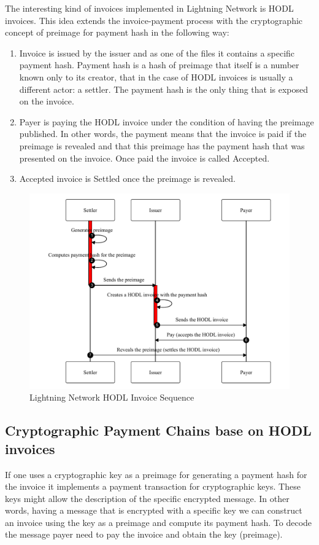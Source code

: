 \documentclass{article}
\begin{document}
The interesting kind of invoices implemented in Lightning Network is HODL invoices. This idea extends the invoice-payment process with the cryptographic concept of preimage for payment hash in the following way:
\begin{enumerate}
	\item Invoice is issued by the issuer and as one of the files it contains a specific payment hash. Payment hash is a hash of preimage that itself is a number known only to its creator, that in the case of HODL invoices is usually a different actor: a settler. The payment hash is the only thing that is exposed on the invoice.
	\item Payer is paying the HODL invoice under the condition of having the preimage published. In other words, the payment means that the invoice is paid if the preimage is revealed and that this preimage has the payment hash that was presented on the invoice. Once paid the invoice is called Accepted.
	\item Accepted invoice is Settled once the preimage is revealed.
\end{enumerate}


\begin{figure}
	\centering
	\includegraphics[scale=0.6]{LNDSequence.pdf}
	\caption{Lightning Network HODL Invoice Sequence}
	\label{fig:fr:lndsequence}
\end{figure}

\subsection{Cryptographic Payment Chains base on HODL invoices}
If one uses a cryptographic key as a preimage for generating a payment hash for the invoice it implements a payment transaction for cryptographic keys. These keys might allow the description of the specific encrypted message. In other words, having a message that is encrypted with a specific key we can construct an invoice using the key as a preimage and compute its payment hash. To decode the message payer need to pay the invoice and obtain the key (preimage).
\end{document}
